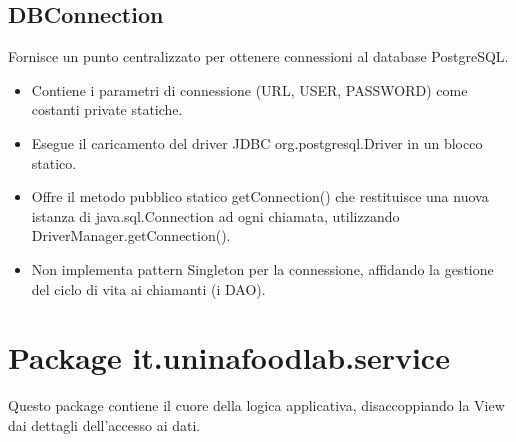 \documentclass[a4paper, 12pt]{article}
\begin{document}
\subsection{DBConnection}
Fornisce un punto centralizzato per ottenere connessioni al database PostgreSQL.
\begin{itemize}
    \item Contiene i parametri di connessione (URL, USER, PASSWORD) come costanti private statiche.
    \item Esegue il caricamento del driver JDBC org.postgresql.Driver in un blocco statico.
    \item Offre il metodo pubblico statico getConnection() che restituisce una nuova istanza di java.sql.Connection ad ogni chiamata, utilizzando DriverManager.getConnection().
    \item Non implementa pattern Singleton per la connessione, affidando la gestione del ciclo di vita ai chiamanti (i DAO).
\end{itemize}

\section{Package it.uninafoodlab.service}
Questo package contiene il cuore della logica applicativa, disaccoppiando la View dai dettagli dell'accesso ai dati.
\end{document}
